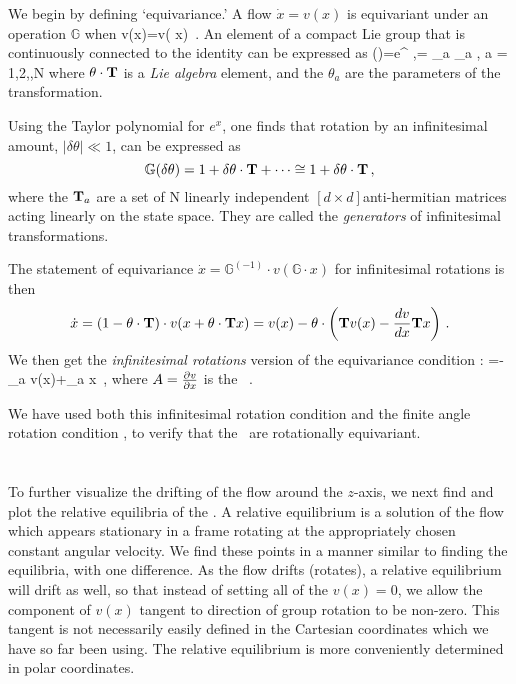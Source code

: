 We begin by defining `equivariance.'
A flow $\dot{x}= v(x)$ is equivariant under an operation $\mathbb{G}$ when
\beq
{} \cdot v(x)=v( \cdot x)
\,.
An element of a compact Lie group that is continuously connected to the identity can be expressed as
\beq
{}(\theta)=e^{{\theta} \cdot \Lg },\quad \theta \cdot \Lg = \sum \theta_a \Lg_a , a = 1,2,\cdots,N
where $\theta \cdot \Lg$ is a \emph{Lie algebra} element, and the $\theta_a$ are the parameters of the transformation.

Using the Taylor polynomial for $e^{x}$, one finds that rotation by an infinitesimal amount, $|\delta \theta| \ll 1$, can be expressed as
\[
\mathbb{G}(\delta \theta)=1+\delta \theta \cdot \Lg  + \cdots \cong 1 + \delta \theta \cdot \Lg
\,,
\]
where the $\mathbf{T}_a$ are a set of N linearly independent $[d\times d]$anti-hermitian matrices acting linearly on the state space. They are called the \emph{generators} of infinitesimal transformations.

The statement of equivariance
$
\dot{x}=\mathbb{G}^{(-1)} \cdot v(\mathbb{G} \cdot x)
$
for infinitesimal rotations is then
\[
\dot{x}=(1-\theta \cdot \mathbf{T} ) \cdot v(x+\theta \cdot \mathbf{T}  x)
       =v(x)-\theta \cdot \left(
            \mathbf{T} v(x) - \frac{dv}{dx} \mathbf{T} x
                     \right)
\,.
\]
We then get the {\em infinitesimal
rotations} version of the equivariance condition
:
=- \Lg_a v(x)+\Mvar \Lg_a x
\,,
\label{eq:InfnmslRot}
\eeq
where $A = \frac{\partial v}{\partial x}$ is the \stabmat\ .

We have used both this infinitesimal rotation condition and
the finite angle rotation condition , to
verify that the \cLe\ are rotationally equivariant.


\section{\Reqva}

To further visualize the drifting of the flow around the
$z$-axis, we next find and plot the relative equilibria of
the \cLe. A relative equilibrium is a solution of the flow
which appears stationary in a frame rotating at the
appropriately chosen constant angular velocity. We find these
points in a manner similar to finding the equilibria, with
one difference. As the flow drifts (rotates), a relative
equilibrium will drift as well, so that instead of setting
all of the $v(x)=0$, we allow the component of $v(x)$ tangent
to direction of group rotation to be non-zero. This tangent is not
necessarily easily defined in the
Cartesian coordinates which we have so far been using. The
relative equilibrium is more conveniently determined  in
polar coordinates.

